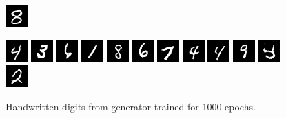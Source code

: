 \begin{figure}[!h]
{        \includegraphics[scale=1]{figures/mnist/appendix/mnist32x32_image0011.png}
    }
    \vspace{0.1cm}
    \centerline{
        \includegraphics[scale=1]{figures/mnist/appendix/mnist32x32_image0012.png}
        \includegraphics[scale=1]{figures/mnist/appendix/mnist32x32_image0013.png}
        \includegraphics[scale=1]{figures/mnist/appendix/mnist32x32_image0014.png}
        \includegraphics[scale=1]{figures/mnist/appendix/mnist32x32_image0015.png}
        \includegraphics[scale=1]{figures/mnist/appendix/mnist32x32_image0016.png}
        \includegraphics[scale=1]{figures/mnist/appendix/mnist32x32_image0017.png}
        \includegraphics[scale=1]{figures/mnist/appendix/mnist32x32_image0018.png}
        \includegraphics[scale=1]{figures/mnist/appendix/mnist32x32_image0019.png}
        \includegraphics[scale=1]{figures/mnist/appendix/mnist32x32_image0020.png}
        \includegraphics[scale=1]{figures/mnist/appendix/mnist32x32_image0021.png}
        \includegraphics[scale=1]{figures/mnist/appendix/mnist32x32_image0022.png}
        \includegraphics[scale=1]{figures/mnist/appendix/mnist32x32_image0023.png}
    }
    \caption{\label{fig:mnist-good}Handwritten digits from generator trained for 1000 epochs.}
\end{figure}

